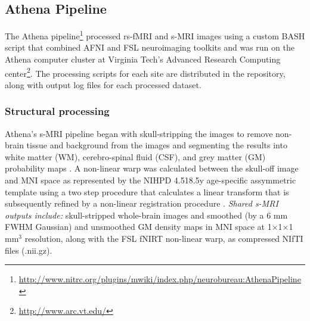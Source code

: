 \documentclass[preprint,12pt,3p]{elsarticle}
\begin{document}
\subsection{Athena Pipeline} 
The Athena pipeline\footnote{\url{http://www.nitrc.org/plugins/mwiki/index.php/neurobureau:AthenaPipeline}}  processed rs-fMRI and s-MRI images using a custom BASH script that combined AFNI \cite{cox1996afni} and FSL \cite{smith2004advances} neuroimaging toolkits and was run on the Athena computer cluster at Virginia Tech's Advanced Research Computing center\footnote{\url{http://www.arc.vt.edu/}}. The processing scripts for each site are distributed in the repository, along with output log files for each processed dataset.

\subsubsection{Structural processing} Athena's s-MRI pipeline began with skull-stripping the images to remove non-brain tissue and background from the images \cite{smith2002_bet} and segmenting the results into white matter (WM), cerebro-spinal fluid (CSF), and grey matter (GM) probability maps \cite{zhang2001_fast}. A non-linear warp was calculated between the skull-off image and MNI space as represented by the NIHPD 4.5\textendash18.5y age-specific assymmetric template \cite{fonov2011unbiased} using a two step procedure that calculates a linear transform \cite{jenkinson2002_flirt} that is subsequently refined by a non-linear registration procedure \cite{andersson2007non}. \emph{Shared s-MRI outputs include:} skull-stripped whole-brain images and smoothed (by a 6 mm FWHM Gaussian) and unsmoothed GM density maps in MNI space at 1$\times$1$\times$1 mm$^3$ resolution, along with the FSL fNIRT non-linear warp, as compressed NIfTI files (.nii.gz). 
\end{document}
